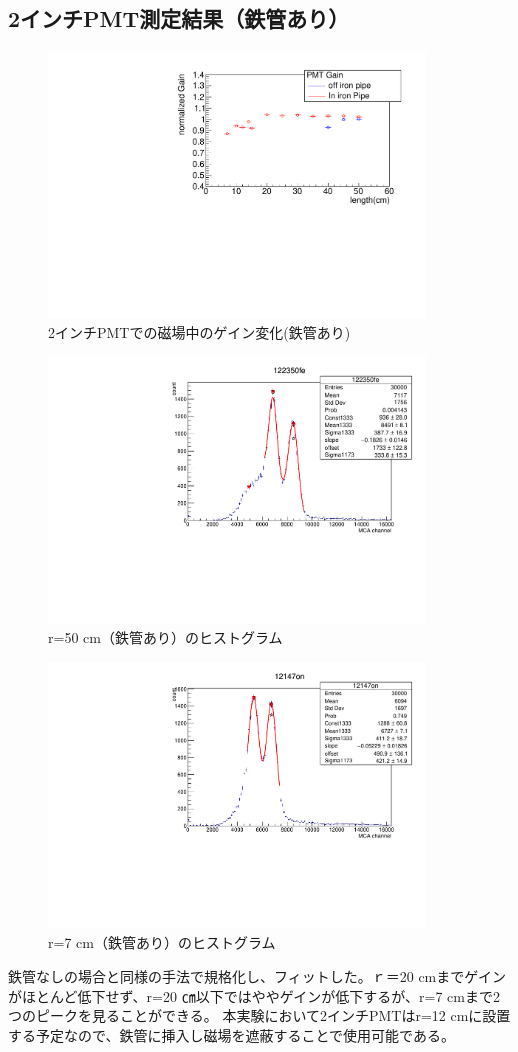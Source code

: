 \subsection{2インチPMT測定結果（鉄管あり）}
\begin{figure}[H]
	\centering
		\includegraphics[angle=-90,width=10cm]{fig/iguchi/bigPMTfit.pdf}
	\caption{2インチPMTでの磁場中のゲイン変化(鉄管あり)}
	\label{bigPMTfit}
\end{figure}
\begin{figure}[H]
	\centering
		\includegraphics[angle=-90,width=10cm]{fig/iguchi/122350fe.pdf}
	\caption{r=50 cm（鉄管あり）のヒストグラム}
	\label{hist50fe}
\end{figure}
\begin{figure}[H]
	\centering
		\includegraphics[angle=-90,width=10cm]{fig/iguchi/12147on.pdf}
	\caption{r=7 cm（鉄管あり）のヒストグラム}
	\label{hist7fe}
\end{figure}
鉄管なしの場合と同様の手法で規格化し、フィットした。ｒ＝20 cmまでゲインがほとんど低下せず、r=20 ㎝以下ではややゲインが低下するが、r=7 cmまで2つのピークを見ることができる。
本実験において2インチPMTはr=12 cmに設置する予定なので、鉄管に挿入し磁場を遮蔽することで使用可能である。

